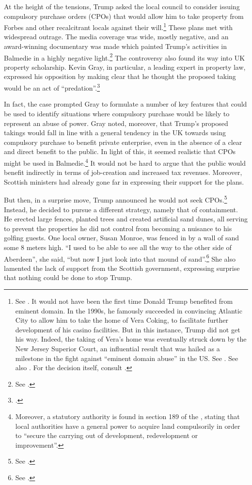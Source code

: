 At the height of the tensions, Trump asked the local council to consider issuing compulsory purchase orders (CPOs) that would allow him to take property from Forbes and other recalcitrant locals against their will.\footnote{See \cite{macaskill09}. It would not have been the first time Donald Trump benefited from eminent domain. In the 1990s, he famously succeeded in convincing Atlantic City to allow him to take the home of Vera Coking, to facilitate further development of his casino facilities. But in this instance, Trump did not get his way. Indeed, the taking of Vera's home was eventually struck down by the New Jersey Superior Court, an influential result that was hailed as a milestone in the fight against ``eminent domain abuse'' in the US. See \cite[297-301]{jones00}. See also \cite{gillespie08}. For the decision itself, consult \cite{banin98}.} These plans met with widespread outrage. The media coverage was wide, mostly negative, and an award-winning documentary was made which painted Trump's activities in Balmedie in a highly negative light.\footnote{See \cite{baxter11}.} The controversy also found its way into UK property scholarship. Kevin Gray, in particular, a leading expert in property law, expressed his opposition by making clear that he thought the proposed taking would be an act of ``predation''.\footcite{gray11}

In fact, the case prompted Gray to formulate a number of key features that could be used to identify situations where compulsory purchase would be likely to represent an abuse of power. Gray noted, moreover, that Trump's proposed takings would fall in line with a general tendency in the UK towards using compulsory purchase to benefit private enterprise, even in the absence of a clear and direct benefit to the public. In light of this, it seemed realistic that CPOs might be used in Balmedie.\footnote{Moreover, a statutory authority is found in section 189 of the \cite{tcpsa97}, stating that local authorities have a general power to acquire land compulsorily in order to ``secure the carrying out of development, redevelopment or improvement''.} It would not be hard to argue that the public would benefit indirectly in terms of job-creation and increased tax revenues. Moreover, Scottish ministers had already gone far in expressing their support for the plans.

But then, in a surprise move, Trump announced he would not seek CPOs.\footnote{See \cite{scotsman11}.} Instead, he decided to pursue a different strategy, namely that of containment. He erected large fences, planted trees and created artificial sand dunes, all serving to prevent the properties he did not control from becoming a nuisance to his golfing guests. One local owner, Susan Monroe, was fenced in by a wall of sand some 8 meters high. ``I used to be able to see all the way to the other side of Aberdeen'', she said, ``but now I just look into that mound of sand''.\footnote{See \cite{booth12}.} She also lamented the lack of support from the Scottish government, expressing surprise that nothing could be done to stop Trump.


